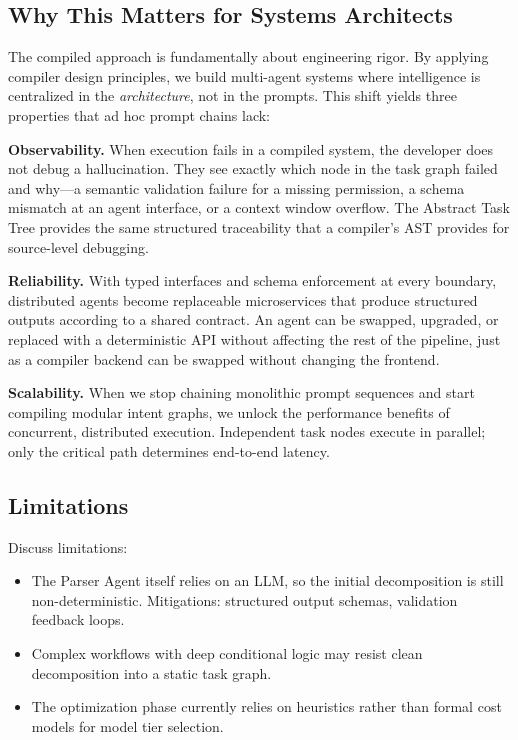 \documentclass[sigconf,nonacm]{acmart}
\begin{document}
\subsection{Why This Matters for Systems Architects}
\label{sec:discussion:architects}

The compiled approach is fundamentally about engineering rigor. By
applying compiler design principles, we build multi-agent systems where
intelligence is centralized in the \emph{architecture}, not in the
prompts. This shift yields three properties that ad hoc prompt chains
lack:

\noindent\textbf{Observability.} When execution fails in a compiled
system, the developer does not debug a hallucination. They see exactly
which node in the task graph failed and why---a semantic validation
failure for a missing permission, a schema mismatch at an agent
interface, or a context window overflow. The Abstract Task Tree provides
the same structured traceability that a compiler's AST provides for
source-level debugging.

\noindent\textbf{Reliability.} With typed interfaces and schema
enforcement at every boundary, distributed agents become replaceable
microservices that produce structured outputs according to a shared
contract. An agent can be swapped, upgraded, or replaced with a
deterministic API without affecting the rest of the pipeline, just as a
compiler backend can be swapped without changing the frontend.

\noindent\textbf{Scalability.} When we stop chaining monolithic prompt
sequences and start compiling modular intent graphs, we unlock the
performance benefits of concurrent, distributed execution. Independent
task nodes execute in parallel; only the critical path determines
end-to-end latency.

\subsection{Limitations}
\label{sec:discussion:limitations}

\begin{todobox}
Discuss limitations:
\begin{itemize}
  \item The Parser Agent itself relies on an LLM, so the initial
        decomposition is still non-deterministic. Mitigations: structured
        output schemas, validation feedback loops.
  \item Complex workflows with deep conditional logic may resist clean
        decomposition into a static task graph.
  \item The optimization phase currently relies on heuristics rather
        than formal cost models for model tier selection.
\end{itemize}
\end{todobox}
\end{document}
